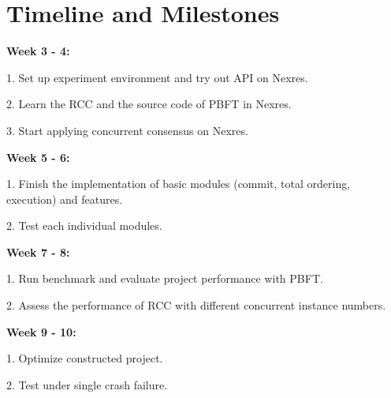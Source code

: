 \section{Timeline and Milestones}
\textbf{Week 3 - 4:}
\par 1. Set up experiment environment and try out API on Nexres.
\par 2. Learn the RCC and the source code of PBFT in Nexres.
\par 3. Start applying concurrent consensus on Nexres. 

\noindent
\textbf{Week 5 - 6:}
\par 1. Finish the implementation of basic modules (commit, total ordering, execution) and features.
\par 2. Test each individual modules.

\noindent
\textbf{Week 7 - 8:}
\par 1. Run benchmark and evaluate project performance with PBFT.
\par 2. Assess the performance of RCC with different concurrent instance numbers.

\noindent
\textbf{Week 9 - 10:}
\par 1. Optimize constructed project.
\par 2. Test under single crash failure.